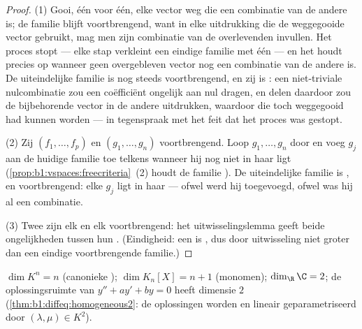 \begin{proof}
(1) Gooi, één voor één, elke vector weg die een combinatie van de
andere is; de familie blijft voortbrengend, want in elke
uitdrukking die de weggegooide vector gebruikt, mag men zijn
combinatie van de overlevenden invullen. Het proces stopt --- elke
stap verkleint een eindige familie met één --- en het houdt precies
op wanneer geen overgebleven vector nog een combinatie van de
andere is. De uiteindelijke familie is nog steeds voortbrengend, en
zij is : een niet-triviale nulcombinatie zou een coëfficiënt
ongelijk aan nul dragen, en delen daardoor zou de bijbehorende
vector in de andere uitdrukken, waardoor die toch weggegooid had
kunnen worden --- in tegenspraak met het feit dat het proces was
gestopt.

(2) Zij $(f_1, \dots, f_p)$  en $(g_1, \dots, g_n)$
voortbrengend. Loop $g_1, \dots, g_n$ door en voeg $g_j$ aan de
huidige familie toe telkens wanneer hij nog niet in haar 
ligt (\cref{prop:b1:vspaces:freecriteria}~(2) houdt de familie
). De uiteindelijke familie is , en voortbrengend: elke
$g_j$ ligt in haar  --- ofwel werd hij toegevoegd, ofwel
was hij al een combinatie.

(3) Twee  zijn elk  en elk voortbrengend: het
uitwisselingslemma geeft beide ongelijkheden tussen hun
. (Eindigheid: een  is , dus door
uitwisseling niet groter dan een eindige voortbrengende familie.)
\end{proof}

\begin{example}\label{ex:b1:findim:dims}
$\dim K^n = n$ (canonieke ); $\dim K_n[X] = n + 1$ (monomen);
$\dim_\R \C = 2$; de oplossingsruimte van $y'' + ay' + by = 0$ heeft
dimensie $2$ (\cref{thm:b1:diffeq:homogeneous2}: de oplossingen
worden  en lineair geparametriseerd door $(\lambda, \mu)
\in K^2$).
\end{example}

